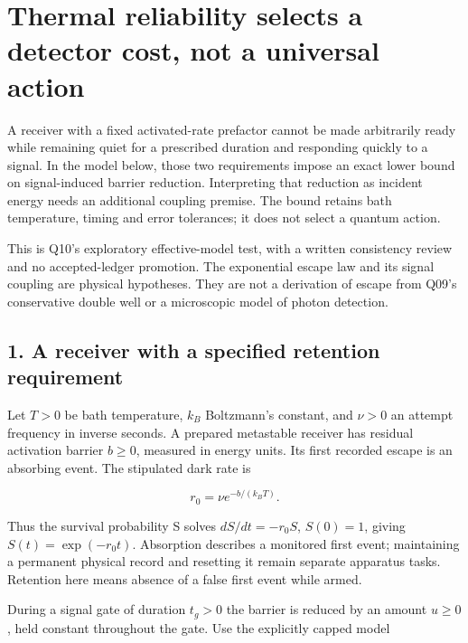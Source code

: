 \documentclass[11pt,a4paper]{article}
\begin{document}
\hypertarget{thermal-reliability-selects-a-detector-cost-not-a-universal-action}{%
\section{Thermal reliability selects a detector cost, not a universal
action}\label{thermal-reliability-selects-a-detector-cost-not-a-universal-action}}

A receiver with a fixed activated-rate prefactor cannot be made
arbitrarily ready while remaining quiet for a prescribed duration and
responding quickly to a signal. In the model below, those two
requirements impose an exact lower bound on signal-induced barrier
reduction. Interpreting that reduction as incident energy needs an
additional coupling premise. The bound retains bath temperature, timing
and error tolerances; it does not select a quantum action.

This is Q10's exploratory effective-model test, with a written
consistency review and no accepted-ledger promotion. The exponential
escape law and its signal coupling are physical hypotheses. They are not
a derivation of escape from Q09's conservative double well or a
microscopic model of photon detection.

\hypertarget{a-receiver-with-a-specified-retention-requirement}{%
\subsection{1. A receiver with a specified retention
requirement}\label{a-receiver-with-a-specified-retention-requirement}}

Let \(T>0\) be bath temperature, \(k_B\) Boltzmann's constant, and
\(\nu>0\) an attempt frequency in inverse seconds. A prepared metastable
receiver has residual activation barrier \(b\ge0\), measured in energy
units. Its first recorded escape is an absorbing event. The stipulated
dark rate is

\[r_0=\nu e^{-b/(k_BT)}. \tag{1}\]

Thus the survival probability S solves \(dS/dt=-r_0S\), \(S(0)=1\),
giving \(S(t)=\exp(-r_0t)\). Absorption describes a monitored first
event; maintaining a permanent physical record and resetting it remain
separate apparatus tasks. Retention here means absence of a false first
event while armed.

During a signal gate of duration \(t_g>0\) the barrier is reduced by an
amount \(u\ge0\), held constant throughout the gate. Use the explicitly
capped model
\end{document}
